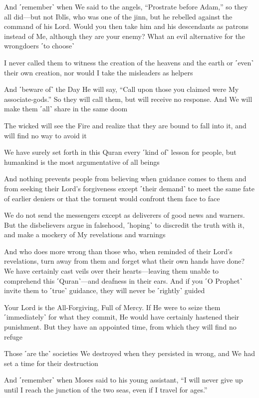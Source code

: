 And ˹remember˺ when We said to the angels, “Prostrate before Adam,” so they all did—but not Iblîs, who was one of the jinn, but he rebelled against the command of his Lord. Would you then take him and his descendants as patrons instead of Me, although they are your enemy? What an evil alternative for the wrongdoers ˹to choose˺

I never called them to witness the creation of the heavens and the earth or ˹even˺ their own creation, nor would I take the misleaders as helpers

And ˹beware of˺ the Day He will say, “Call upon those you claimed were My associate-gods.” So they will call them, but will receive no response. And We will make them ˹all˺ share in the same doom

The wicked will see the Fire and realize that they are bound to fall into it, and will find no way to avoid it

We have surely set forth in this Quran every ˹kind of˺ lesson for people, but humankind is the most argumentative of all beings

And nothing prevents people from believing when guidance comes to them and from seeking their Lord’s forgiveness except ˹their demand˺ to meet the same fate of earlier deniers or that the torment would confront them face to face

We do not send the messengers except as deliverers of good news and warners. But the disbelievers argue in falsehood, ˹hoping˺ to discredit the truth with it, and make a mockery of My revelations and warnings

And who does more wrong than those who, when reminded of their Lord’s revelations, turn away from them and forget what their own hands have done? We have certainly cast veils over their hearts—leaving them unable to comprehend this ˹Quran˺—and deafness in their ears. And if you ˹O Prophet˺ invite them to ˹true˺ guidance, they will never be ˹rightly˺ guided

Your Lord is the All-Forgiving, Full of Mercy. If He were to seize them ˹immediately˺ for what they commit, He would have certainly hastened their punishment. But they have an appointed time, from which they will find no refuge

Those ˹are the˺ societies We destroyed when they persisted in wrong, and We had set a time for their destruction

And ˹remember˺ when Moses said to his young assistant, “I will never give up until I reach the junction of the two seas, even if I travel for ages.”

